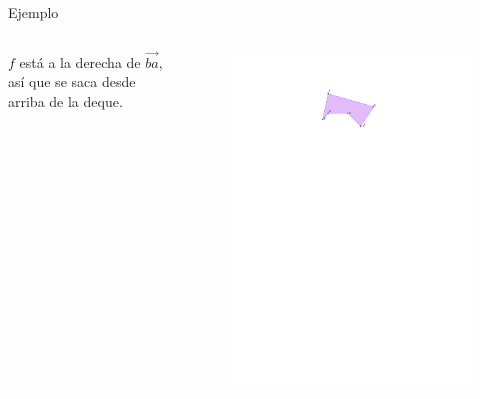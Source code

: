 \documentclass[aspectratio=169,xcolor=dvipsnames, t]{beamer}
\begin{document}
\begin{frame}{Ejemplo}
  \begin{columns}
    \begin{column}{0.5\textwidth}
      $f$ está a la derecha de $\overrightarrow{ba}$, así que se saca desde arriba de la deque.
    \end{column}
    \begin{column}{0.5\textwidth}
      \begin{figure}
        \centering
        \includegraphics[width=\linewidth, height=0.5\textheight, page=12, keepaspectratio]{IPE/Melkman.pdf}
      \end{figure}
    \end{column}
  \end{columns}
\end{frame}
\end{document}
